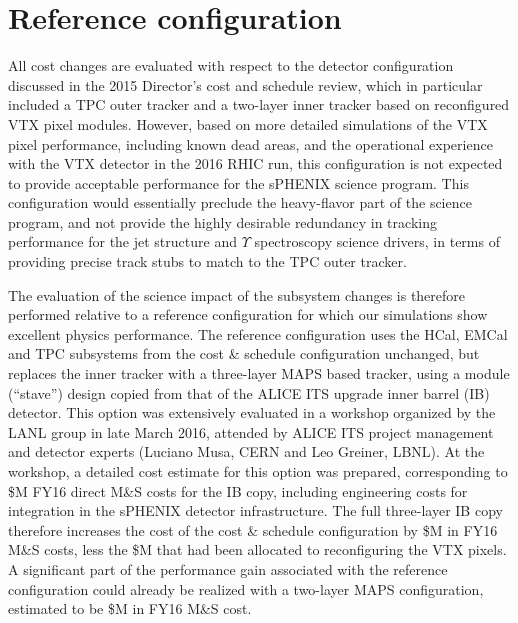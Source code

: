 \section{Reference configuration}

All cost changes are evaluated with respect to the detector
configuration discussed in the 2015 Director's cost and schedule
review, which in particular included a TPC outer tracker and a
two-layer inner tracker based on reconfigured VTX pixel
modules. However, based on more detailed simulations of the VTX pixel
performance, including known dead areas, and the operational
experience with the VTX detector in the 2016 RHIC run, this
configuration is not expected to provide acceptable performance for
the sPHENIX science program. This configuration would essentially
preclude the heavy-flavor part of the science program, and not provide
the highly desirable redundancy in tracking performance for the jet
structure and $\Upsilon$ spectroscopy science drivers, in terms of
providing precise track stubs to match to the TPC outer tracker.

The evaluation of the science impact of the subsystem changes is
therefore performed relative to a reference configuration for which
our simulations show excellent physics performance. The reference
configuration uses the HCal, EMCal and TPC subsystems from the cost \&
schedule configuration unchanged, but replaces the inner tracker with
a three-layer MAPS based tracker, using a module (``stave'') design
copied from that of the ALICE ITS upgrade inner barrel (IB)
detector. This option was extensively evaluated in a workshop
organized by the LANL group in late March 2016, attended by ALICE ITS
project management and detector experts (Luciano Musa, CERN and  Leo Greiner, LBNL).  At
the workshop, a detailed cost estimate for this option was prepared,
corresponding to \${\threeLayerMAPS}M FY16 direct M\&S costs for the
IB copy, including engineering costs for integration in the sPHENIX
detector infrastructure.  The full three-layer IB copy therefore
increases the cost of the cost \& schedule configuration by
\${\threeLayerMAPS}M in FY16 M\&S costs, less the \${\noVTX}M that had
been allocated to reconfiguring the VTX pixels. A significant part of
the performance gain associated with the reference configuration could
already be realized with a two-layer MAPS configuration, estimated to be
\${\twoLayerMAPS}M in FY16 M\&S cost.

